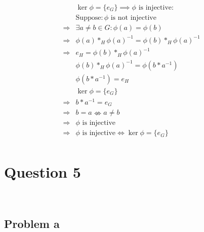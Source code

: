 \documentclass{article}
\begin{document}
\begin{equation*}
    \begin{split}
        &\ker\phi=\{e_G\}\implies\phi\text{ is injective} :\\
        &\text{Suppose}: \phi\text{ is not injective}\\
        \Rightarrow&\exists a\ne b\in G:\phi(a)=\phi(b)\\
        \Rightarrow&\phi(a)*_H\phi(a)^{-1}=\phi(b)*_H\phi(a)^{-1}\\
        \Rightarrow&e_H=\phi(b)*_H\phi(a)^{-1}\\
        &\phi(b)*_H\phi(a)^{-1}=\phi(b*a^{-1})\\
        &\phi(b*a^{-1})=e_H\\
        &\ker\phi=\{e_G\}\\
        \Rightarrow&b*a^{-1}=e_G\\
        \Rightarrow&b=a\nLeftrightarrow a\ne b\\
        \Rightarrow&\phi\text{ is injective}\\
        \Rightarrow&\phi\text{ is injective}\Leftrightarrow\ker\phi=\{e_G\}\\
    \end{split}
\end{equation*}

\newpage

\section*{Question 5}

~

\subsection*{Problem a}

~
\end{document}
